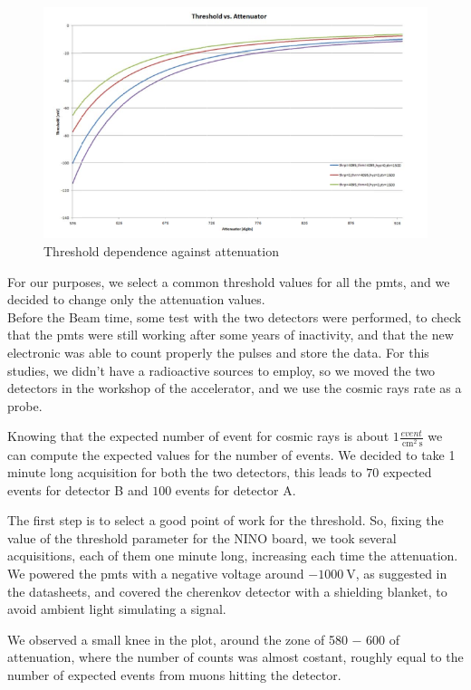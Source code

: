 \begin{figure}[hbtp]
 \centering
 \includegraphics[scale=0.4]{Analysis/ThrvsAtt.png}
 \caption{Threshold dependence against attenuation}
 \end{figure}

For our purposes, we select a common threshold values for all the pmts, and we decided to change only the attenuation values.\\
Before the Beam time, some test with the two detectors were performed, to check that the pmts were still working after some years of inactivity, and that the new electronic was able to count properly the pulses and store the data. For this studies, we didn't have a radioactive sources to employ, so we moved the two detectors in the workshop of the accelerator, and we use the cosmic rays rate as a probe. 

Knowing that the expected number of event for cosmic rays is about $1 \frac{event}{\SI{}{\centi \meter\squared} \SI{}{\second}}$ we can compute the expected values for the number of events. We decided to take 1 minute long acquisition for both the two detectors, this leads to $70$ expected events for detector B  and  $100$ events for detector A.  \smallskip

The first step is to select a good point of work for the threshold. So, fixing the value of the threshold parameter for the NINO board, we took several acquisitions, each of them one minute long, increasing each time the attenuation. We powered the pmts with a negative voltage around $ \SI{-1000}{\volt}$, as suggested in the datasheets, and covered the cherenkov detector with a shielding blanket, to avoid ambient light simulating a signal.

We observed a small knee in the plot, around the zone of 580 − 600 of attenuation, where the number of counts was almost costant, roughly equal to the number of expected events from muons hitting the detector. 


